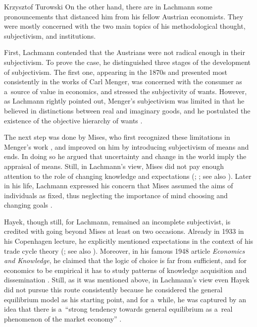 \begin{artengenv}{Krzysztof Turowski}
On the other hand, there are in Lachmann some pronouncements that distanced him from his fellow Austrian economists. They were mostly concerned with the two main topics of his methodological thought, subjectivism, and institutions.

First, Lachmann contended that the Austrians were not radical enough in their subjectivism.
To prove the case, he distinguished three stages of the development of subjectivism. The first one, appearing in the 1870s and presented most consistently in the works of Carl Menger, was concerned with the consumer as a~source of value in economics, and stressed the subjectivity of wants.
However, as Lachmann rightly pointed out, Menger's subjectivism was limited in that he believed in distinctions between real and imaginary goods, and he postulated the existence of the objective hierarchy of wants \parencite[57]{lachmann-menger}.

The next step was done by Mises, who first recognized these limitations in Menger's work \parencite[192]{mises-epe}, and improved on him by introducing subjectivism of means and ends. In doing so he argued that uncertainty and change in the world imply the appraisal of means. Still, in Lachmann's view, Mises did not pay enough attention to the role of changing knowledge and expectations (\cite[57]{lachmann-expectations}; \citeyear[37]{lachmann-extension}; see also \cite[65--66]{koppl}). Later in his life, Lachmann expressed his concern that Mises assumed the aims of individuals as fixed, thus neglecting the importance of mind choosing and changing goals \parencite[6]{lachmann-shackle-place}.

Hayek, though still, for Lachmann, remained an incomplete subjectivist, is credited with going beyond Mises at least on two occasions.
Already in 1933 in his Copenhagen lecture, he explicitly mentioned expectations in the context of his trade cycle theory (\cite{hayek-1933}; see also \cite[259]{lachmann-hicks-neo}). Moreover, in his famous 1948 article \emph{Economics and Knowledge}, he claimed that the logic of choice is far from sufficient, and for economics to be empirical it has to study patterns of knowledge acquisition and dissemination \parencite[33]{hayek-knowledge}.
Still, as it was mentioned above, in Lachmann's view even Hayek did not pursue this route consistently because he considered the general equilibrium model as his starting point, and for a~while, he was captured by an idea that there is a~``strong tendency towards general equilibrium as a~real phenomenon of the market economy'' \parencite[60]{lachmann-kaleidic}.


\end{artengenv}
